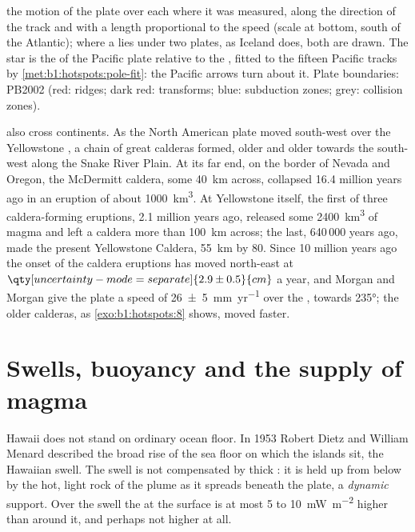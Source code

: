 \begin{omfigure}
{the motion of the plate over each  where it was measured, along the
direction of the track and with a length proportional to the speed (scale at
bottom, south of the Atlantic); where a  lies under two plates, as Iceland does, both are
drawn. The star is the  of the Pacific plate relative to the
, fitted to the fifteen Pacific tracks by
\cref{met:b1:hotspots:pole-fit}: the Pacific arrows turn about it. Plate
boundaries: PB2002 (red: ridges; dark red: transforms; blue: subduction zones;
grey: collision zones).}
\label{fig:b1:hotspots:map}
\end{omfigure}


 also cross continents. As the North American plate moved
south-west over the Yellowstone , a chain of great calderas formed,
older and older towards the south-west along the Snake River Plain. At its
far end, on the border of Nevada and Oregon, the McDermitt caldera, some
\qty{40}{km} across, collapsed 16.4 million years ago in an eruption of about
\qty{1000}{km^3}. At Yellowstone itself, the first of three caldera-forming
eruptions, 2.1 million years ago, released some \qty{2400}{km^3} of magma and
left a caldera more than \qty{100}{km} across; the last, 640\,000 years ago,
made the present Yellowstone Caldera, \qty{55}{km} by 80. Since 10 million
years ago the onset of the caldera eruptions has moved north-east at
$\qty[uncertainty-mode=separate]{2.9 \pm 0.5}{cm}$ a year, and Morgan and
Morgan give the plate a speed of
\qty[uncertainty-mode=separate]{26 \pm 5}{mm.yr^{-1}} over the , towards
\ang{235}; the older calderas, as \cref{exo:b1:hotspots:8} shows, moved
faster.

\section{Swells, buoyancy and the supply of magma}\label{sec:b1:hotspots:swells}

Hawaii does not stand on ordinary ocean floor. In 1953 Robert Dietz and
William Menard described the broad rise of the sea floor on which the islands
sit, the Hawaiian swell. The swell is not compensated by thick : it is
held up from below by the hot, light rock of the plume as it spreads beneath
the plate, a \emph{dynamic} support. Over the swell the  at the
surface is at most 5 to \qty{10}{mW.m^{-2}} higher than around it, and perhaps
not higher at all.

